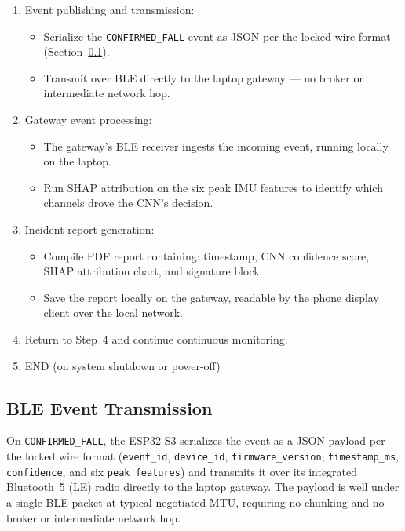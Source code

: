 \begin{enumerate}
    \item Event publishing and transmission:
          \begin{itemize}
              \item Serialize the \texttt{CONFIRMED\_FALL} event as JSON per the locked wire format (Section~\ref{sec:ble_transmission}).
              \item Transmit over BLE directly to the laptop gateway --- no broker or intermediate network hop.
          \end{itemize}

    \item Gateway event processing:
          \begin{itemize}
              \item The gateway's BLE receiver ingests the incoming event, running locally on the laptop.
              \item Run SHAP attribution on the six peak IMU features to identify which channels drove the CNN's decision.
          \end{itemize}

    \item Incident report generation:
          \begin{itemize}
              \item Compile PDF report containing: timestamp, CNN confidence score, SHAP attribution chart, and signature block.
              \item Save the report locally on the gateway, readable by the phone display client over the local network.
          \end{itemize}

    \item Return to Step~4 and continue continuous monitoring.

    \item END (on system shutdown or power-off)

\end{enumerate}



\subsection{BLE Event Transmission}
\label{sec:ble_transmission}

On \texttt{CONFIRMED\_FALL}, the ESP32-S3 serializes the event as a JSON payload per the locked wire format (\texttt{event\_id}, \texttt{device\_id}, \texttt{firmware\_version}, \texttt{timestamp\_ms}, \texttt{confidence}, and six \texttt{peak\_features}) and transmits it over its integrated Bluetooth~5 (LE) radio directly to the laptop gateway. The payload is well under a single BLE packet at typical negotiated MTU, requiring no chunking and no broker or intermediate network hop.

